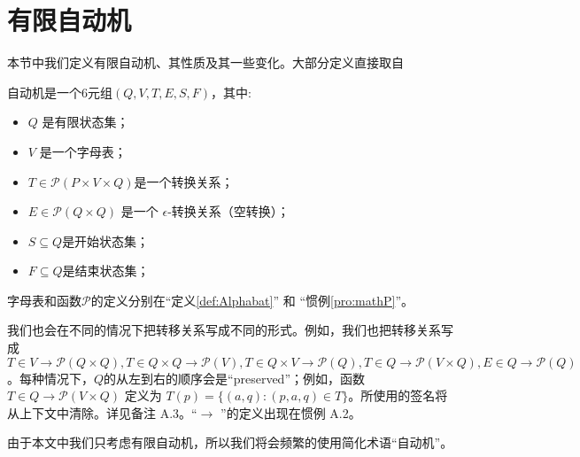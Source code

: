 \chapter{有限自动机}

本节中我们定义有限自动机、其性质及其一些变化。大部分定义直接取自 %

\begin{definition}
    自动机是一个$6$元组$(Q,V,T,E,S,F)$，其中:
    \begin{itemize}
        \item $Q$ 是有限状态集；
        \item $V$ 是一个字母表；
        \item $ T \in \mathcal{P}(P\times V \times Q) $是一个转换关系；
        \item $ E \in \mathcal{P}(Q\times Q)$ 是一个 $\epsilon$-转换关系（空转换）；
        \item $ S \subseteq Q $是开始状态集；
        \item $ F \subseteq Q $是结束状态集；     
    \end{itemize}
    字母表和函数$\mathcal{P}$的定义分别在“定义\ref{def:Alphabat}” 和 “惯例\ref{pro:mathP}”。
\end{definition}


\begin{remark}
    我们也会在不同的情况下把转移关系写成不同的形式。例如，我们也把转移关系写成 $T\in V \longrightarrow \mathcal{P}(Q\times Q),T\in Q \times Q \longrightarrow \mathcal{P}(V),T\in Q \times V \longrightarrow \mathcal{P}(Q),T\in Q \longrightarrow \mathcal{P}(V\times Q),E\in Q \longrightarrow \mathcal{P}(Q)$。每种情况下，$Q$的从左到右的顺序会是“preserved”；例如，函数$T\in Q \longrightarrow \mathcal{P}(V \times Q)$ 定义为 $T(p)=\{ (a,q) : (p,a,q) \in T \}$。所使用的签名将从上下文中清除。详见备注 A.3。“$\longrightarrow$ ”的定义出现在惯例 A.2。

    由于本文中我们只考虑有限自动机，所以我们将会频繁的使用简化术语“自动机”。
\end{remark}



